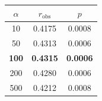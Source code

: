 \begin{tabular}{ccc}
\toprule
$\alpha$ & $r_{\mathrm{obs}}$ & $p$ \\
\midrule
10 & 0.4175 & 0.0008 \\
50 & 0.4313 & 0.0006 \\
\textbf{100} & \textbf{0.4315} & \textbf{0.0006} \\
200 & 0.4280 & 0.0006 \\
500 & 0.4212 & 0.0008 \\
\bottomrule
\end{tabular}
